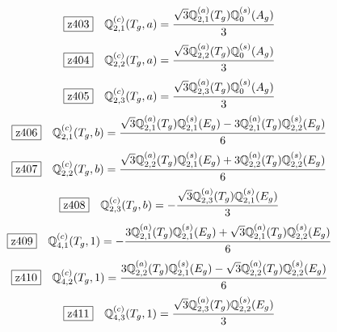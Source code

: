 \documentclass[fleqn,10pt,landscape]{jsarticle}
\begin{document}
\begin{dmath*}
\hspace*{3mm}\fbox{z403}\quad \mathbb{Q}_{2,1}^{(c)}(T_{g},a)=\frac{\sqrt{3} \mathbb{Q}_{2,1}^{(a)}(T_{g}) \mathbb{Q}_{0}^{(s)}(A_{g})}{3}
\end{dmath*}
\begin{dmath*}
\hspace*{3mm}\fbox{z404}\quad \mathbb{Q}_{2,2}^{(c)}(T_{g},a)=\frac{\sqrt{3} \mathbb{Q}_{2,2}^{(a)}(T_{g}) \mathbb{Q}_{0}^{(s)}(A_{g})}{3}
\end{dmath*}
\begin{dmath*}
\hspace*{3mm}\fbox{z405}\quad \mathbb{Q}_{2,3}^{(c)}(T_{g},a)=\frac{\sqrt{3} \mathbb{Q}_{2,3}^{(a)}(T_{g}) \mathbb{Q}_{0}^{(s)}(A_{g})}{3}
\end{dmath*}
\begin{dmath*}
\hspace*{3mm}\fbox{z406}\quad \mathbb{Q}_{2,1}^{(c)}(T_{g},b)=\frac{\sqrt{3} \mathbb{Q}_{2,1}^{(a)}(T_{g}) \mathbb{Q}_{2,1}^{(s)}(E_{g}) - 3 \mathbb{Q}_{2,1}^{(a)}(T_{g}) \mathbb{Q}_{2,2}^{(s)}(E_{g})}{6}
\end{dmath*}
\begin{dmath*}
\hspace*{3mm}\fbox{z407}\quad \mathbb{Q}_{2,2}^{(c)}(T_{g},b)=\frac{\sqrt{3} \mathbb{Q}_{2,2}^{(a)}(T_{g}) \mathbb{Q}_{2,1}^{(s)}(E_{g}) + 3 \mathbb{Q}_{2,2}^{(a)}(T_{g}) \mathbb{Q}_{2,2}^{(s)}(E_{g})}{6}
\end{dmath*}
\begin{dmath*}
\hspace*{3mm}\fbox{z408}\quad \mathbb{Q}_{2,3}^{(c)}(T_{g},b)=- \frac{\sqrt{3} \mathbb{Q}_{2,3}^{(a)}(T_{g}) \mathbb{Q}_{2,1}^{(s)}(E_{g})}{3}
\end{dmath*}
\begin{dmath*}
\hspace*{3mm}\fbox{z409}\quad \mathbb{Q}_{4,1}^{(c)}(T_{g},1)=- \frac{3 \mathbb{Q}_{2,1}^{(a)}(T_{g}) \mathbb{Q}_{2,1}^{(s)}(E_{g}) + \sqrt{3} \mathbb{Q}_{2,1}^{(a)}(T_{g}) \mathbb{Q}_{2,2}^{(s)}(E_{g})}{6}
\end{dmath*}
\begin{dmath*}
\hspace*{3mm}\fbox{z410}\quad \mathbb{Q}_{4,2}^{(c)}(T_{g},1)=\frac{3 \mathbb{Q}_{2,2}^{(a)}(T_{g}) \mathbb{Q}_{2,1}^{(s)}(E_{g}) - \sqrt{3} \mathbb{Q}_{2,2}^{(a)}(T_{g}) \mathbb{Q}_{2,2}^{(s)}(E_{g})}{6}
\end{dmath*}
\begin{dmath*}
\hspace*{3mm}\fbox{z411}\quad \mathbb{Q}_{4,3}^{(c)}(T_{g},1)=\frac{\sqrt{3} \mathbb{Q}_{2,3}^{(a)}(T_{g}) \mathbb{Q}_{2,2}^{(s)}(E_{g})}{3}
\end{dmath*}
\end{document}
